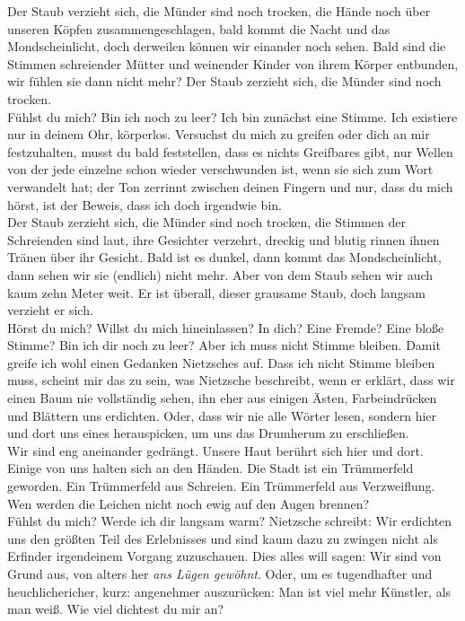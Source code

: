 \documentclass[a4paper, 12pt]{report}
\begin{document}
Der Staub verzieht sich, die Münder sind noch trocken, die Hände noch über unseren Köpfen zusammengeschlagen, bald kommt die Nacht und das Mondscheinlicht, doch derweilen können wir einander noch sehen. 
Bald sind die Stimmen schreiender Mütter und weinender Kinder von ihrem Körper entbunden, wir fühlen sie dann nicht mehr?
Der Staub zerzieht sich, die Münder sind noch trocken. \\

Fühlst du mich? 
Bin ich noch zu leer? 
Ich bin zunächst eine Stimme. 
Ich existiere nur in deinem Ohr, körperlos.
Versuchst du mich zu greifen oder dich an mir festzuhalten, musst du bald feststellen, dass es nichts Greifbares gibt, nur Wellen von der jede einzelne schon wieder verschwunden ist, wenn sie sich zum Wort verwandelt hat;
der Ton zerrinnt zwischen deinen Fingern und nur, dass du mich hörst, ist der Beweis, dass ich doch irgendwie bin.\\

Der Staub zerzieht sich, die Münder sind noch trocken, die Stimmen der Schreienden sind laut, ihre Gesichter verzehrt, dreckig und blutig rinnen ihnen Tränen über ihr Gesicht.
Bald ist es dunkel, dann kommt das Mondscheinlicht, dann sehen wir sie (endlich) nicht mehr.
Aber von dem Staub sehen wir auch kaum zehn Meter weit. 
Er ist überall, dieser grausame Staub, doch langsam verzieht er sich. \\

Hörst du mich? Willst du mich hineinlassen? In dich? Eine Fremde? Eine bloße Stimme?
Bin ich dir noch zu leer?
Aber ich muss nicht Stimme bleiben. 
Damit greife ich wohl einen Gedanken Nietzsches auf. 
Dass ich nicht Stimme bleiben muss, scheint mir das zu sein, was Nietzsche beschreibt, wenn er erklärt, dass wir einen Baum nie vollständig sehen, ihn eher aus einigen Ästen, Farbeindrücken und Blättern uns erdichten.
Oder, dass wir nie alle Wörter lesen, sondern hier und dort uns eines herauspicken, um uns das Drumherum zu erschließen.\\

Wir sind eng aneinander gedrängt.
Unsere Haut berührt sich hier und dort.
Einige von uns halten sich an den Händen.
Die Stadt ist ein Trümmerfeld geworden. 
Ein Trümmerfeld aus Schreien.
Ein Trümmerfeld aus Verzweiflung.
Wen werden die Leichen nicht noch ewig auf den Augen brennen?\\

Fühlst du mich? Werde ich dir langsam warm? Nietzsche schreibt: 
\glqq Wir erdichten uns den größten Teil des Erlebnisses und sind kaum dazu zu zwingen nicht als \glq Erfinder\grq{} irgendeinem Vorgang zuzuschauen. 
Dies alles will sagen: Wir sind von Grund aus, von alters her \textit{ans Lügen gewöhnt}. Oder, um es tugendhafter und heuchlichericher, kurz: angenehmer auszurücken: 
Man ist viel mehr Künstler, als man weiß\grqq{}. 
Wie viel dichtest du mir an?\\
\end{document}
